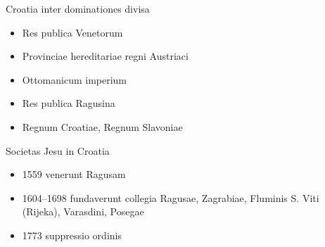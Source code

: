 \documentclass[14pt]{beamer}
\begin{document}
\begin{frame}{Croatia inter dominationes divisa}

  \begin{itemize}
  \item Res publica Venetorum
  \item Provinciae hereditariae regni Austriaci
  \item   Ottomanicum imperium
  \item   Res publica Ragusina
  \item   Regnum Croatiae, Regnum Slavoniae
  \end{itemize}
\end{frame}

{
    \begin{frame}[plain]
    \end{frame}
    }





\begin{frame}{Societas Jesu in Croatia}
\begin{itemize}
  \item \alert{1559} venerunt Ragusam
  \item \alert{1604–1698} fundaverunt collegia Ragusae, Zagrabiae, Fluminis S. Viti (Rijeka), Varasdini, Posegae
  \item \alert{1773} suppressio ordinis
\end{itemize}
\end{frame}
\end{document}

